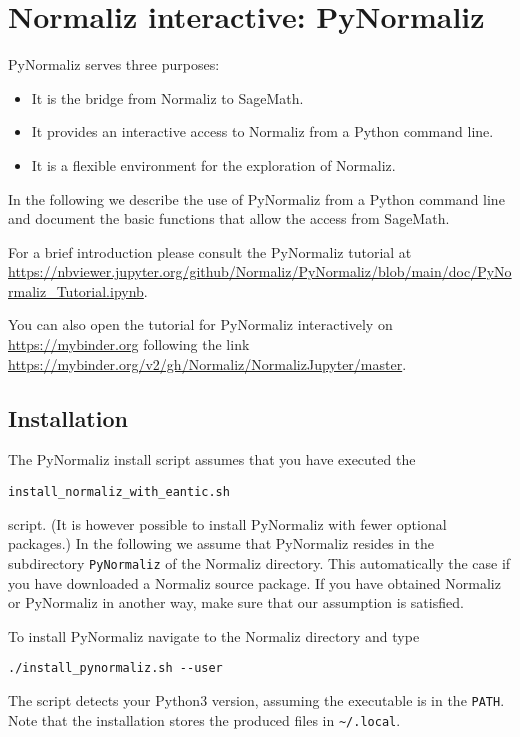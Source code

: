 \newpage

\section{Normaliz interactive: PyNormaliz}\label{PyNormaliz}

\begin{small}
	
PyNormaliz serves three purposes:
\begin{itemize}
	\item It is the bridge from Normaliz to SageMath.
	\item It provides an interactive access to Normaliz from a Python command line.
	\item It is a flexible environment for the exploration of Normaliz.
\end{itemize}
In the following we describe the use of PyNormaliz from a Python command line and document the basic functions that allow the access from SageMath.

For a brief introduction please consult the PyNormaliz tutorial at \url{https://nbviewer.jupyter.org/github/Normaliz/PyNormaliz/blob/main/doc/PyNormaliz_Tutorial.ipynb}.

You can also open the tutorial for PyNormaliz interactively on \url{https://mybinder.org} following the link \url{https://mybinder.org/v2/gh/Normaliz/NormalizJupyter/master}.

\subsection{Installation}

The PyNormaliz install script assumes that you have executed the
\begin{center}
	\verb|install_normaliz_with_eantic.sh|
\end{center}
script. (It is however possible to install PyNormaliz with fewer optional packages.) In the following we assume that PyNormaliz resides in the subdirectory \verb|PyNormaliz| of the Normaliz directory. This automatically the case if you have downloaded a Normaliz source package. If you have obtained Normaliz or PyNormaliz in another way, make sure that our assumption is satisfied.

To install PyNormaliz navigate to the Normaliz directory and type
\begin{Verbatim}
./install_pynormaliz.sh --user
\end{Verbatim}
The script detects your Python3 version, assuming the executable is in the \verb|PATH|. Note that the installation stores the produced files in \verb|~/.local|.


\end{small}

